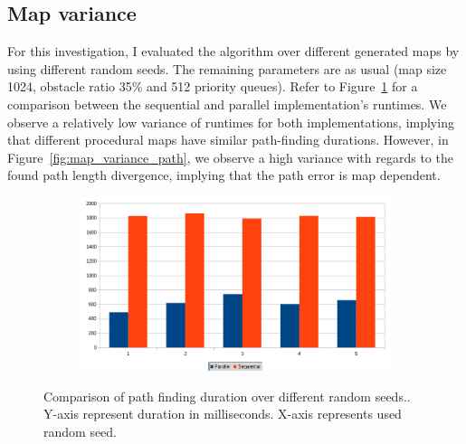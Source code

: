 \documentclass{article}
\begin{document}
\subsection{Map variance}
%
For this investigation, I evaluated the algorithm over different generated maps by using different random seeds. The remaining parameters are as usual (map size 1024, obstacle ratio 35\% and 512 priority queues). Refer to Figure~\ref{fig:map_variance} for a comparison between the sequential and parallel implementation's runtimes. We observe a relatively low variance of runtimes for both implementations, implying that different procedural maps have similar path-finding durations. However, in Figure~\ref{fig:map_variance_path}, we observe a high variance with regards to the found path length divergence, implying that the path error is map dependent.
%
\begin{figure}[h]
    \centering
    \begin{subfigure}[b]{1.0\textwidth}
        \centering
        \includegraphics[width=\textwidth]{figures/map_variance.png}
    \end{subfigure}
    \hfill
    \caption{Comparison of path finding duration over different random seeds.. Y-axis represent duration in milliseconds. X-axis represents used random seed.}
    \label{fig:map_variance}
\end{figure}
%
\end{document}
